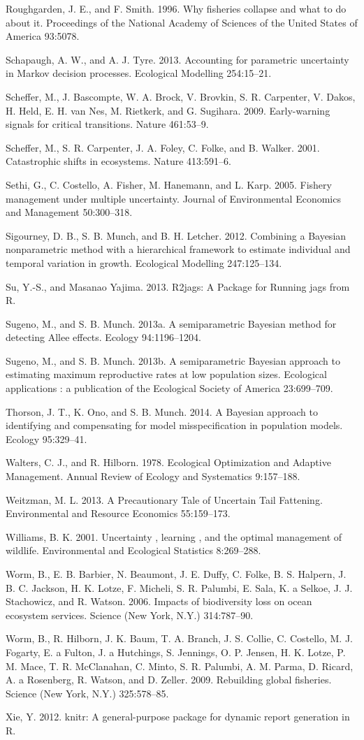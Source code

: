\documentclass[author-year, 12pt,review]{elsarticle} %
\begin{document}
Roughgarden, J. E., and F. Smith. 1996. Why fisheries collapse and what
to do about it. Proceedings of the National Academy of Sciences of the
United States of America 93:5078.

Schapaugh, A. W., and A. J. Tyre. 2013. Accounting for parametric
uncertainty in Markov decision processes. Ecological Modelling
254:15--21.

Scheffer, M., J. Bascompte, W. A. Brock, V. Brovkin, S. R. Carpenter, V.
Dakos, H. Held, E. H. van Nes, M. Rietkerk, and G. Sugihara. 2009.
Early-warning signals for critical transitions. Nature 461:53--9.

Scheffer, M., S. R. Carpenter, J. A. Foley, C. Folke, and B. Walker.
2001. Catastrophic shifts in ecosystems. Nature 413:591--6.

Sethi, G., C. Costello, A. Fisher, M. Hanemann, and L. Karp. 2005.
Fishery management under multiple uncertainty. Journal of Environmental
Economics and Management 50:300--318.

Sigourney, D. B., S. B. Munch, and B. H. Letcher. 2012. Combining a
Bayesian nonparametric method with a hierarchical framework to estimate
individual and temporal variation in growth. Ecological Modelling
247:125--134.

Su, Y.-S., and Masanao Yajima. 2013. R2jags: A Package for Running jags
from R.

Sugeno, M., and S. B. Munch. 2013a. A semiparametric Bayesian method for
detecting Allee effects. Ecology 94:1196--1204.

Sugeno, M., and S. B. Munch. 2013b. A semiparametric Bayesian approach
to estimating maximum reproductive rates at low population sizes.
Ecological applications : a publication of the Ecological Society of
America 23:699--709.

Thorson, J. T., K. Ono, and S. B. Munch. 2014. A Bayesian approach to
identifying and compensating for model misspecification in population
models. Ecology 95:329--41.

Walters, C. J., and R. Hilborn. 1978. Ecological Optimization and
Adaptive Management. Annual Review of Ecology and Systematics
9:157--188.

Weitzman, M. L. 2013. A Precautionary Tale of Uncertain Tail Fattening.
Environmental and Resource Economics 55:159--173.

Williams, B. K. 2001. Uncertainty , learning , and the optimal
management of wildlife. Environmental and Ecological Statistics
8:269--288.

Worm, B., E. B. Barbier, N. Beaumont, J. E. Duffy, C. Folke, B. S.
Halpern, J. B. C. Jackson, H. K. Lotze, F. Micheli, S. R. Palumbi, E.
Sala, K. a Selkoe, J. J. Stachowicz, and R. Watson. 2006. Impacts of
biodiversity loss on ocean ecosystem services. Science (New York, N.Y.)
314:787--90.

Worm, B., R. Hilborn, J. K. Baum, T. A. Branch, J. S. Collie, C.
Costello, M. J. Fogarty, E. a Fulton, J. a Hutchings, S. Jennings, O. P.
Jensen, H. K. Lotze, P. M. Mace, T. R. McClanahan, C. Minto, S. R.
Palumbi, A. M. Parma, D. Ricard, A. a Rosenberg, R. Watson, and D.
Zeller. 2009. Rebuilding global fisheries. Science (New York, N.Y.)
325:578--85.

Xie, Y. 2012. knitr: A general-purpose package for dynamic report
generation in R.
\end{document}

